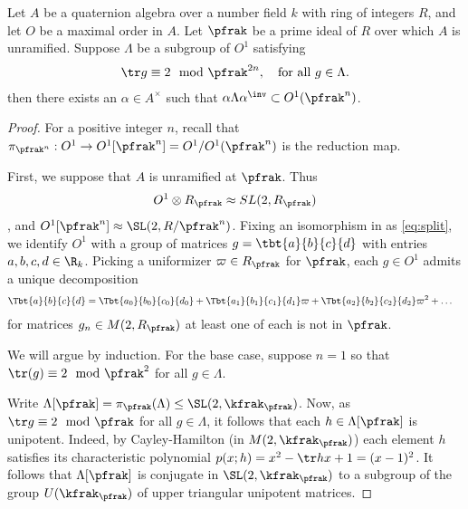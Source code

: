 \begin{lemma}\label{lemma:MangosteenPicosdeEuropa}
    Let $A$ be a quaternion algebra over a number field $k$ with ring of integers $R$, and let $O$ be a maximal order in $A$.
    Let $\pfrak$ be a prime ideal of $R$ over which $A$ is unramified.
    Suppose $\Lambda$ be a subgroup of $O^1$ satisfying
    \begin{align}\label{eq:trace}
        \tr g \equiv 2 \mod \pfrak^{2n}, \quad \text{for all $g \in \Lambda$}.
    \end{align}
    then there exists an $\alpha \in A^\times$ such that $\alpha \Lambda \alpha^\inv \subset O^1(\pfrak^n)$.
\end{lemma}
\begin{proof}
    For a positive integer $n$, recall that $\pi_{\pfrak^n}: O^1 \to O^1[\pfrak^n]=O^1/O^1(\pfrak^n)$ is the reduction map.

    First, we suppose that $A$ is unramified at $\pfrak$.
    Thus
    \begin{align}\label{eq:split}
        O^1 \otimes R_\pfrak \approx SL(2,R_\pfrak)
    \end{align}, and $O^1[\pfrak^n] \approx \SL(2,R/\pfrak^n)$. Fixing an isomorphism in as \ref{eq:split}, we identify $O^1$ with a group of matrices $g = \tbt{a}{b}{c}{d}$ with entries $a,b,c,d \in \R_k$. Picking a uniformizer $\varpi \in R_\pfrak$ for $\pfrak$, each $g\in O^1$ admits a unique decomposition
    \begin{align}\label{eq:decomposition}
        \Tbt{a}{b}{c}{d} & =  \Tbt{a_0}{b_0}{c_0}{d_0} +\Tbt{a_1}{b_1}{c_1}{d_1} \varpi + \Tbt{a_2}{b_2}{c_2}{d_2} \varpi^2 + \dots
    \end{align}
    for matrices $g_n \in M(2,R_\pfrak)$ at least one of each is not in $\pfrak$.

    We will argue by induction. For the base case, suppose $n=1$ so that $\tr(g) \equiv 2 \mod \pfrak^2$ for all $g \in \Lambda$.


    Write $\Lambda[\pfrak] = \pi_{\pfrak}(\Lambda)\leq \SL(2,\kfrak_\pfrak)$. Now, as $\tr g \equiv 2 \mod \pfrak$ for all $g \in \Lambda$, it follows that each $h \in \Lambda[\pfrak]$ is unipotent.
    Indeed, by Cayley-Hamilton (in $M(2,\kfrak_\pfrak)$) each element $h$ satisfies its characteristic polynomial $p(x;h)=x^2 - \tr h x + 1= (x-1)^2$.
    It follows that $\Lambda[\pfrak]$ is conjugate in $\SL(2,\kfrak_\pfrak)$ to a subgroup of the group $U(\kfrak_\pfrak)$ of upper triangular unipotent matrices.


\end{proof}
